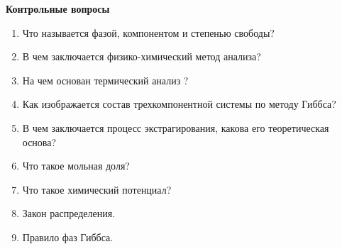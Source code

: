 \textbf{Контрольные вопросы}
\begin{enumerate}
\item Что называется фазой, компонентом и степенью свободы? 
\item В чем заключается физико-химический метод анализа? 
\item На чем основан термический анализ ?
\item Как изображается состав трехкомпонентной системы по методу Гиббса?
\item В чем заключается процесс экстрагирования,  какова его теоретическая основа?
\item Что такое мольная доля?
\item Что такое химический потенциал?
\item Закон распределения.
\item Правило фаз Гиббса.
\end{enumerate}